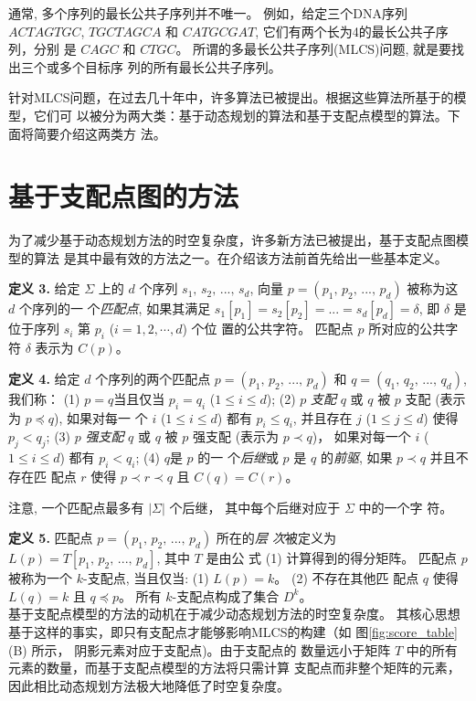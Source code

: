 通常, 多个序列的最长公共子序列并不唯一。 例如，给定三个DNA序列 $ACTAGTGC$,
$TGCTAGCA$ 和 $CATGCGAT$, 它们有两个长为4的最长公共子序列，分别
是 $CAGC$ 和 $CTGC$。 所谓的多最长公共子序列(MLCS)问题, 就是要找出三个或多个目标序
列的所有最长公共子序列。

针对MLCS问题，在过去几十年中，许多算法已被提出。根据这些算法所基于的模型，它们可
以被分为两大类：基于动态规划的算法和基于支配点模型的算法。下面将简要介绍这两类方
法。


\section{基于支配点图的方法}
\label{sec:Dominant Point}

为了减少基于动态规划方法的时空复杂度，许多新方法已被提出，基于支配点图模型的算法
是其中最有效的方法之一。在介绍该方法前首先给出一些基本定义。

\textbf{定义 3.} 给定 $\Sigma$ 上的 $d$ 个序列 $s_1,\, s_2,\, ...,\,
s_d$, 向量 $p = (p_1,\, p_2,\, ...,\, p_d)$ 被称为这 $d$ 个序列的一
个\emph{匹配点}, 如果其满足 $s_1[p_1] = s_2[p_2] = ... = s_d[p_d] =
\delta$, 即 $\delta$ 是位于序列 $s_i$ 第 $p_i$ ($i=1,2,\cdots,d$) 个位
置的公共字符。 匹配点 $p$ 所对应的公共字符 $\delta$ 表示为 $C(p)$。

\textbf{定义 4.} 给定 $d$ 个序列的两个匹配点 $p = (p_1,\, p_2,\,
...,\, p_d)$ 和 $q = (q_1,\, q_2,\, ...,\, q_d)$, 我们称： (1) $p =
q$当且仅当 $p_i = q_i$ ($1 \leq i \leq d$); (2) $p$
\emph{支配 }$q$ 或 $q$ 被 $p$ 支配 (表示为 $p \preceq q$), 如果对每一
个 $i$ ($1 \leq i \leq d$) 都有 $p_i \leq q_i$, 并且存在 $j$
($1 \leq j \leq d$) 使得 $p_j<q_j$; (3) $p$ \emph{强支配}
$q$ 或 $q$ 被 $p$ 强支配 (表示为 $p \prec q$)， 如果对每一个 $i$ ($1
\leq i \leq d$) 都有 $p_i < q_i$; (4) $q$是 $p$ 的一
个\emph{后继}或 $p$ 是 $q$ 的\emph{前驱}, 如果 $p \prec q$ 并且不存在匹
配点 $r$ 使得 $p \prec r \prec q$ 且 $C(q) = C(r)$。

注意, 一个匹配点最多有 $|\Sigma|$ 个后继， 其中每个后继对应于 $\Sigma$ 中的一个字
符。

\textbf{定义 5.} 匹配点 $p = (p_1,\, p_2,\, ...,\, p_d)$ 所在的\emph{层
  次}被定义为 $L(p) = T[p_1,\, p_2,\, ...,\, p_d]$, 其中 $T$ 是由公
式 (1) 计算得到的得分矩阵。 匹配点 $p$ 被称为一个 $k$-支配点, 当且仅当:
(1) $L(p) = k$。 (2) 不存在其他匹
配点 $q$ 使得 $L(q) = k$ 且 $q \preceq p$。 所有 $k$-支配点构成了集合 $D^k$。\\

基于支配点模型的方法的动机在于减少动态规划方法的时空复杂度。 其核心思想
基于这样的事实，即只有支配点才能够影响MLCS的构建（如
图\ref{fig:score_table} (B) 所示， 阴影元素对应于支配点)。由于支配点的
数量远小于矩阵 $T$ 中的所有元素的数量，而基于支配点模型的方法将只需计算
支配点而非整个矩阵的元素，因此相比动态规划方法极大地降低了时空复杂度。

